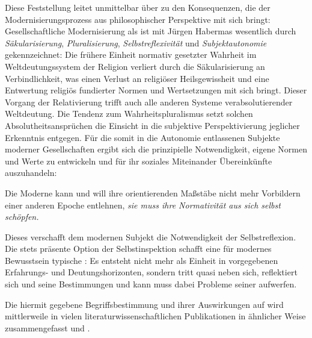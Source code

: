 Diese Feststellung leitet unmittelbar über zu den Konsequenzen, die der
Modernisierungsprozess aus philosophischer Perspektive mit sich bringt:
Gesellschaftliche Modernisierung als \Cite{fundamentale Veränderung des
  Denkens und der Normbildung}  ist mit
Jürgen Habermas wesentlich durch \emph{Säkularisierung},
\emph{Pluralisierung}, \emph{Selbstreflexivität} und \emph{Subjektautonomie}
gekennzeichnet: Die frühere Einheit normativ gesetzter Wahrheit im
Weltdeutungssystem der Religion verliert durch die Säkularisierung an
Verbindlichkeit, was einen Verlust an religiöser Heilsgewissheit und eine
Entwertung religiös fundierter Normen und Wertsetzungen mit sich
bringt. Dieser Vorgang der Relativierung trifft auch alle anderen Systeme
verabsolutierender Weltdeutung. Die Tendenz zum Wahrheitspluralismus setzt
solchen Absolutheitsansprüchen die Einsicht in die subjektive Perspektivierung
jeglicher Erkenntnis entgegen. Für die
somit in die Autonomie entlassenen Subjekte moderner Gesellschaften ergibt
sich die prinzipielle Notwendigkeit, eigene Normen und Werte zu entwickeln und
für ihr soziales Miteinander Übereinkünfte auszuhandeln:

\begin{BlockQuote}
  Die Moderne kann und will ihre orientierenden Maßstäbe nicht mehr Vorbildern
  einer anderen Epoche entlehnen, \emph{sie muss ihre Normativität aus sich
    selbst schöpfen.}
\end{BlockQuote}
Dieses \Cite{Aus-sich-selbst-Schöpfen} verschafft dem modernen Subjekt die
Notwendigkeit der Selbstreflexion. Die stets präsente Option der
Selbstinspektion schafft eine für modernes Bewusstsein typische
\Cite{Dissoziation}: Es entsteht nicht mehr als Einheit in vorgegebenen
Erfahrungs- und Deutungshorizonten, sondern tritt quasi neben sich,
reflektiert sich und seine Bestimmungen und kann  muss dabei Probleme
seiner \Cite{Identität} aufwerfen.

Die hiermit gegebene Begriffsbestimmung \Cite{gesellschaftlicher
  Modernisierung} und ihrer Auswirkungen auf \Cite{modernes Bewusstsein} wird
mittlerweile in vielen literaturwissenschaftlichen Publikationen in ähnlicher
Weise zusammengefasst und \Cite{verdichtet sich allmählich zu einem soliden
  Konsens}.


